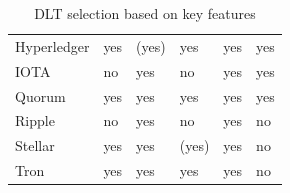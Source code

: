 \documentclass[conference]{IEEEtran}
\begin{document}
\begin{table}[h]
\begin{tabular}{@{}llllll@{}}
Hyperledger                   & yes                                                                                    & (yes)                                & yes                                                                                    & yes                                 & yes                                   \\
IOTA                          & no                                                                                     & yes                                  & no                                                                                     & yes                                 & yes                                   \\
Quorum                        & yes                                                                                    & yes                                  & yes                                                                                    & yes                                 & yes                                   \\
Ripple                        & no                                                                                     & yes                                  & no                                                                                     & yes                                 & no                                    \\
Stellar                       & yes                                                                                    & yes                                  & (yes)                                                                                  & yes                                 & no                                    \\
Tron                          & yes                                                                                    & yes                                  & yes                                                                                    & yes                                 & no                                    \\ \bottomrule
\end{tabular}
\caption{DLT selection based on key features}
\label{tab:selection}
\end{table}
\end{document}

